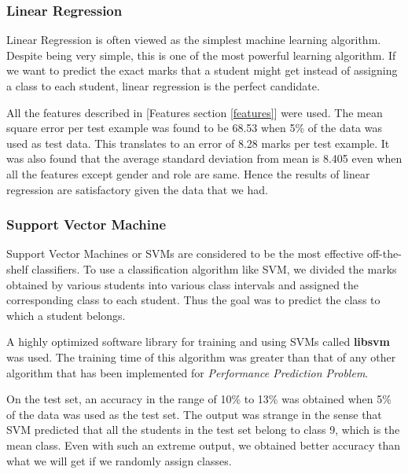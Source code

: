 \documentclass[12pt]{article}
\begin{document}
	
	\subsubsection{Linear Regression}
	Linear Regression is often viewed as the simplest machine learning algorithm.
	Despite being very simple, this is one of the most powerful learning
	algorithm. If we want to predict the exact marks that a student might
	get instead of assigning a class to each student, linear regression is
	the perfect candidate.\newline
	
	All the features described in [Features section \ref{features}] were used. The
	mean square error per test example was found to be 68.53 when 5\% of
	the data was used as test data. This translates to an error of 8.28
	marks per test example. It was also found that the average standard deviation
	from mean is 8.405 even when all the features except gender and role
	are same. Hence the results of linear regression are satisfactory given
	the data that we had.
	
	\newpage
	
	\subsubsection{Support Vector Machine}
	Support Vector Machines or SVMs are considered to be the most effective
	off-the-shelf classifiers. To use a classification algorithm like SVM, 
	we divided the marks obtained by various students into various class
	intervals and assigned the corresponding class to each student. Thus
	the goal was to predict the class to which a student belongs.\newline
	
	A highly optimized software library for training and using SVMs called
	\textbf{libsvm}\cite{libsvm} was used. The training time of this 
	algorithm was greater than that of any other algorithm that has been
	implemented for \textit{Performance Prediction Problem}.\newline
	
	On the test set, an accuracy in the range of 10\% to 13\% was obtained
	when 5\% of the data was used as the test set. The output was strange
	in the sense that SVM predicted that all the students in the test set
	belong to class 9, which is the mean class. Even with such an extreme
	output, we obtained better accuracy than what we will get if we randomly assign
	classes. \newline
	
\end{document}
